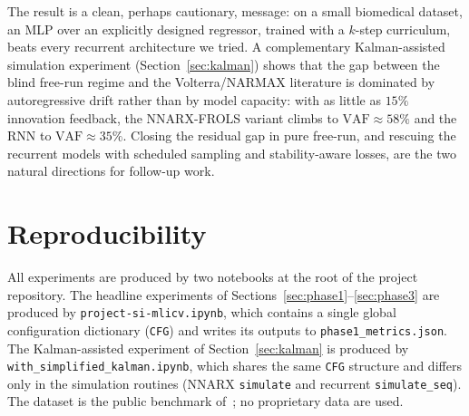 \documentclass[conference]{IEEEtran}
\begin{document}
The result is a clean, perhaps cautionary, message: on a small
biomedical dataset, an MLP over an explicitly designed regressor,
trained with a $k$-step curriculum, beats every recurrent architecture
we tried. A complementary Kalman-assisted simulation experiment
(Section~\ref{sec:kalman}) shows that the gap between the blind
free-run regime and the Volterra/NARMAX literature is dominated by
autoregressive drift rather than by model capacity: with as little as
$15\%$ innovation feedback, the NNARX-FROLS variant climbs to
$\mathrm{VAF}\approx 58\%$ and the RNN to $\mathrm{VAF}\approx 35\%$.
Closing the residual gap in pure free-run, and rescuing the recurrent
models with scheduled sampling and stability-aware losses, are the
two natural directions for follow-up work.

\section*{Reproducibility}

All experiments are produced by two notebooks at the root of the
project repository. The headline experiments of
Sections~\ref{sec:phase1}--\ref{sec:phase3} are produced by
\texttt{project-si-mlicv.ipynb}, which contains a single global
configuration dictionary (\texttt{CFG}) and writes its outputs to
\texttt{phase1\_metrics.json}. The Kalman-assisted experiment of
Section~\ref{sec:kalman} is produced by
\texttt{with\_simplified\_kalman.ipynb}, which shares the same
\texttt{CFG} structure and differs only in the simulation routines
(NNARX \texttt{simulate} and recurrent \texttt{simulate\_seq}). The
dataset is the public benchmark of~\cite{Vlaar2018,VlaarDataset};
no proprietary data are used.
\end{document}
